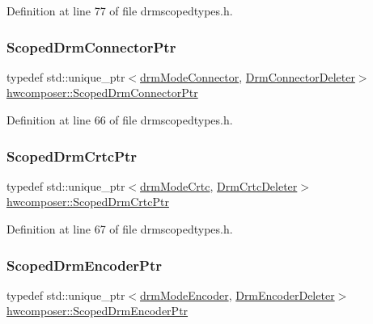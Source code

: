 Definition at line 77 of file drmscopedtypes.\+h.

\mbox{\label{namespacehwcomposer_a6e831db409c69fed0af20a9cb29b50f1}} 
\subsubsection{\texorpdfstring{Scoped\+Drm\+Connector\+Ptr}{ScopedDrmConnectorPtr}}
{\footnotesize\ttfamily typedef std\+::unique\+\_\+ptr$<$\mbox{\hyperlink{nativedisplay_8h_a16ea3fc6b16060fd1e1257707006440e}{drm\+Mode\+Connector}}, \mbox{\hyperlink{structhwcomposer_1_1DrmConnectorDeleter}{Drm\+Connector\+Deleter}}$>$ \mbox{\hyperlink{namespacehwcomposer_a6e831db409c69fed0af20a9cb29b50f1}{hwcomposer\+::\+Scoped\+Drm\+Connector\+Ptr}}}



Definition at line 66 of file drmscopedtypes.\+h.

\mbox{\label{namespacehwcomposer_a9571d0c874674e369f17aa93c5d863e8}} 
\subsubsection{\texorpdfstring{Scoped\+Drm\+Crtc\+Ptr}{ScopedDrmCrtcPtr}}
{\footnotesize\ttfamily typedef std\+::unique\+\_\+ptr$<$\mbox{\hyperlink{drmscopedtypes_8h_a847e3d935cfc3d51910e1a3934e88a1b}{drm\+Mode\+Crtc}}, \mbox{\hyperlink{structhwcomposer_1_1DrmCrtcDeleter}{Drm\+Crtc\+Deleter}}$>$ \mbox{\hyperlink{namespacehwcomposer_a9571d0c874674e369f17aa93c5d863e8}{hwcomposer\+::\+Scoped\+Drm\+Crtc\+Ptr}}}



Definition at line 67 of file drmscopedtypes.\+h.

\mbox{\label{namespacehwcomposer_a8bf37e42152b3284fd9f087f8c02cd5c}} 
\subsubsection{\texorpdfstring{Scoped\+Drm\+Encoder\+Ptr}{ScopedDrmEncoderPtr}}
{\footnotesize\ttfamily typedef std\+::unique\+\_\+ptr$<$\mbox{\hyperlink{drmscopedtypes_8h_a6a3ef235514bbe2e938575fc4d2c919c}{drm\+Mode\+Encoder}}, \mbox{\hyperlink{structhwcomposer_1_1DrmEncoderDeleter}{Drm\+Encoder\+Deleter}}$>$ \mbox{\hyperlink{namespacehwcomposer_a8bf37e42152b3284fd9f087f8c02cd5c}{hwcomposer\+::\+Scoped\+Drm\+Encoder\+Ptr}}}




